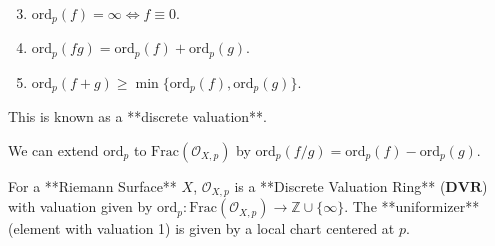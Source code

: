 \documentclass{article}
\begin{document}
\begin{enumerate}
    \setcounter{enumi}{2} %
    \item $\text{ord}_p(f) = \infty \iff f \equiv 0$.
    \item $\text{ord}_p(f g) = \text{ord}_p(f) + \text{ord}_p(g)$.
    \item $\text{ord}_p(f+g) \geq \min \{\text{ord}_p(f), \text{ord}_p(g)\}$.
\end{enumerate}
This is known as a **discrete valuation**.

We can extend $\text{ord}_p$ to $\text{Frac}(\mathcal{O}_{X, p})$ by $\text{ord}_p(f/g) = \text{ord}_p(f) - \text{ord}_p(g)$.

\begin{lemma}
For a **Riemann Surface** $X$, $\mathcal{O}_{X, p}$ is a **Discrete Valuation Ring** ($\mathbf{DVR}$) with valuation given by $\text{ord}_p: \text{Frac}(\mathcal{O}_{X, p}) \to \mathbb{Z} \cup \{\infty\}$.
The **uniformizer** (element with valuation 1) is given by a local chart centered at $p$.
\end{lemma}
\end{document}
